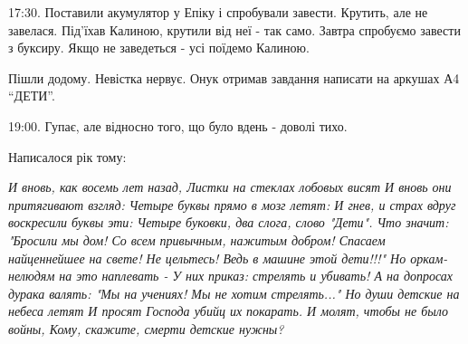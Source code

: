 17:30. Поставили акумулятор у Епіку і спробували завести. Крутить, але не
завелася. Під'їхав Калиною, крутили від неї - так само. Завтра спробуємо
завести з буксиру. Якщо не заведеться - усі поїдемо Калиною.

Пішли додому. Невістка нервує. Онук отримав завдання написати на аркушах А4
\enquote{ДЕТИ}.

19:00. Гупає, але відносно того, що було вдень - доволі тихо.

Написалося рік тому:

\begingroup
\raggedcolumns
\begin{multicols}{2} %
\setlength{\parindent}{0pt}
\obeycr\noindent
\em
И вновь, как восемь лет назад,
Листки на стеклах лобовых висят
И вновь они притягивают взгляд:
Четыре буквы прямо в мозг летят:
\smallskip
И гнев, и страх вдруг воскресили буквы эти:
Четыре буковки, два слога, слово "Дети".
Что значит: "Бросили мы дом!
Со всем привычным, нажитым добром!
Спасаем найценнейшее на свете!
Не цельтесь! Ведь в машине этой дети!!!"
\smallskip
Но оркам-нелюдям на это наплевать -
У них приказ: стрелять и убивать!
А на допросах дурака валять:
"Мы на учениях! Мы не хотим стрелять..."
\smallskip
Но души детские на небеса летят
И просят Господа убийц их покарать.
И молят, чтобы не было войны,
Кому, скажите, смерти детские нужны?
\restorecr
\end{multicols} %

\endgroup

